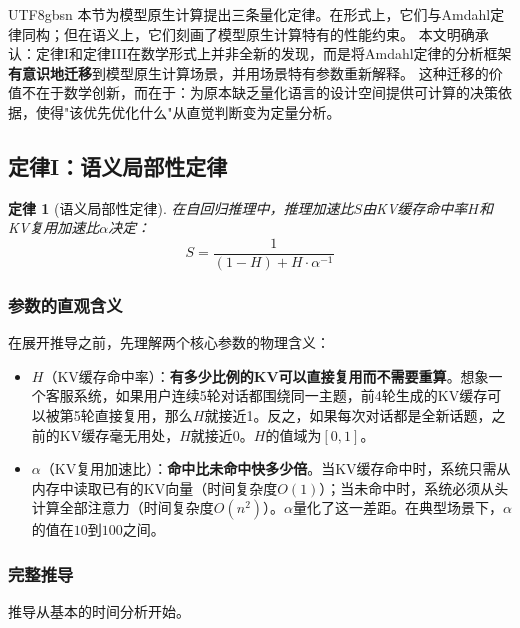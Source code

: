 \documentclass[11pt,a4paper]{article}
\newtheorem{law}{定律}[section]
\begin{document}
\begin{CJK*}{UTF8}{gbsn}
本节为模型原生计算提出三条量化定律。在形式上，它们与Amdahl定律同构；但在语义上，它们刻画了模型原生计算特有的性能约束。
本文明确承认：定律I和定律III在数学形式上并非全新的发现，而是将Amdahl定律的分析框架\textbf{有意识地迁移}到模型原生计算场景，并用场景特有参数重新解释。
这种迁移的价值不在于数学创新，而在于：为原本缺乏量化语言的设计空间提供可计算的决策依据，使得"该优先优化什么"从直觉判断变为定量分析。

\subsection{定律I：语义局部性定律}
\label{sec:law1}

\begin{law}[语义局部性定律]
在自回归推理中，推理加速比$S$由KV缓存命中率$H$和KV复用加速比$\alpha$决定：
\begin{equation}
\label{eq:locality}
S = \frac{1}{(1-H) + H \cdot \alpha^{-1}}
\end{equation}
\end{law}

\subsubsection{参数的直观含义}

在展开推导之前，先理解两个核心参数的物理含义：

\begin{itemize}[nosep]
\item $H$（KV缓存命中率）：\textbf{有多少比例的KV可以直接复用而不需要重算}。想象一个客服系统，如果用户连续5轮对话都围绕同一主题，前4轮生成的KV缓存可以被第5轮直接复用，那么$H$就接近1。反之，如果每次对话都是全新话题，之前的KV缓存毫无用处，$H$就接近0。$H$的值域为$[0, 1]$。
\item $\alpha$（KV复用加速比）：\textbf{命中比未命中快多少倍}。当KV缓存命中时，系统只需从内存中读取已有的KV向量（时间复杂度$O(1)$）；当未命中时，系统必须从头计算全部注意力（时间复杂度$O(n^2)$）。$\alpha$量化了这一差距。在典型场景下，$\alpha$的值在$10$到$100$之间。
\end{itemize}

\subsubsection{完整推导}

推导从基本的时间分析开始。


\end{CJK*}
\end{document}
